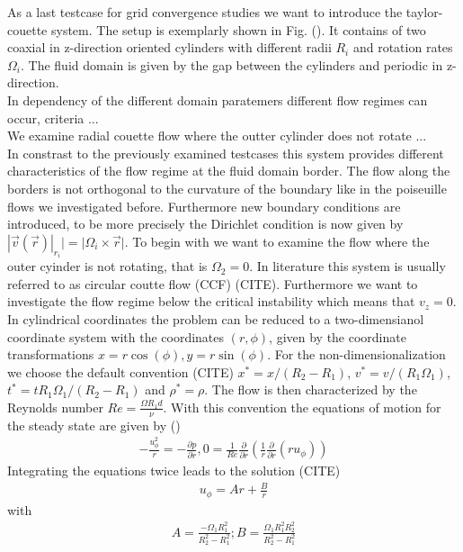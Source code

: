 As a last testcase for grid convergence studies we want to introduce the taylor-couette system.
The setup is exemplarly shown in Fig. (). It contains of two coaxial in z-direction oriented cylinders
with different radii $R_i$ and rotation rates $\Omega_i$. The fluid domain is given by the gap between the cylinders and
periodic in z-direction.\\
In dependency of the different domain paratemers different flow regimes can occur, criteria ...\\
We examine radial couette flow where the outter cylinder does not rotate ...\\
In constrast to the previously examined testcases this system provides different characteristics
of the flow regime at the fluid domain border. The flow along the borders is not orthogonal to the curvature of
the boundary like in the poiseuille flows we investigated before. Furthermore  new boundary
conditions are introduced, to be more precisely the Dirichlet condition is now given by $|\vec{v}(\vec{r})|_{r_i} | = |\Omega_i \times \vec{r}|$.
To begin with we want to examine the flow where the outer cyinder is not rotating, that is $\Omega_2 = 0$.
In literature this system is usually referred to as circular coutte flow (CCF) (CITE). Furthermore we want to investigate the flow regime
below the critical instability which means that $v_z=0$. In cylindrical coordinates the problem can be reduced to a two-dimensianol coordinate system with
the coordinates $(r, \phi)$, given by the coordinate transformations $x=r\cos(\phi), y = r\sin(\phi)$.
For the non-dimensionalization we choose the default convention (CITE) $x^*=x/(R_2 - R_1)$, $v^*=v/(R_1\Omega_1)$, $t^*=tR_1\Omega_1/(R_2-R_1)$ and $\rho^*=\rho$.
The flow is then characterized by the Reynolds number $Re = \frac{\Omega R_1d}{\nu}$. With this convention the equations of motion for the steady state are given by ()
\begin{align}
    -\frac{u^2_\phi}{r} = - \frac{\partial p}{\partial r}, 0 = \frac{1}{Re}\frac{\partial}{\partial r}\left(\frac{1}{r}\frac{\partial}{\partial r}(r u_\phi)\right)
\end{align}
Integrating the equations twice leads to the solution (CITE)
\begin{align}
    u_\phi = Ar + \frac{B}{r}
\end{align}
with
\begin{align}
    A = \frac{-\Omega_1R_1^2}{R^2_2 - R^2_1} ; B = \frac{\Omega_1R^2_1 R^2_2}{R^2_2 - R^2_1}
\end{align}

